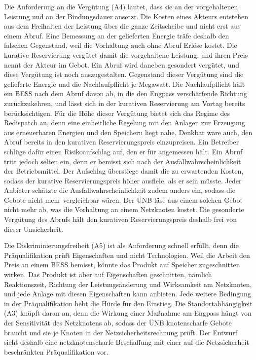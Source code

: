 Die Anforderung an die Vergütung (A4) lautet, dass sie an der vorgehaltenen Leistung und an der Bindungsdauer ansetzt.
Die Kosten eines Akteurs entstehen aus dem Freihalten der Leistung über die ganze Zeitscheibe und nicht erst aus einem Abruf.
Eine Bemessung an der gelieferten Energie träfe deshalb den falschen Gegenstand, weil die Vorhaltung auch ohne Abruf Erlöse kostet.
Die kurative Reservierung vergütet damit die vorgehaltene Leistung, und ihren Preis nennt der Akteur im Gebot.
Ein Abruf wird daneben gesondert vergütet, und diese Vergütung ist noch auszugestalten.
Gegenstand dieser Vergütung sind die gelieferte Energie und die Nachlaufpflicht je Megawatt.
Die Nachlaufpflicht hält ein \ac{BESS} nach dem Abruf davon ab, in die den Engpass verschärfende Richtung zurückzukehren, und lässt sich in der kurativen Reservierung am Vortag bereits berücksichtigen.
Für die Höhe dieser Vergütung bietet sich das Regime des Redispatch an, denn eine einheitliche Regelung mit den Anlagen zur Erzeugung aus erneuerbaren Energien und den Speichern liegt nahe.
Denkbar wäre auch, den Abruf bereits in den kurativen Reservierungspreis einzupreisen.
Ein Betreiber schlüge dafür einen Risikoaufschlag auf, den er für angemessen hält.
Ein Abruf tritt jedoch selten ein, denn er bemisst sich nach der Ausfallwahrscheinlichkeit der Betriebsmittel.
Der Aufschlag überstiege damit die zu erwartenden Kosten, sodass der kurative Reservierungspreis höher ausfiele, als er sein müsste.
Jeder Anbieter schätzte die Ausfallwahrscheinlichkeit zudem anders ein, sodass die Gebote nicht mehr vergleichbar wären.
Der \ac{ÜNB} läse aus einem solchen Gebot nicht mehr ab, was die Vorhaltung an einem Netzknoten kostet.
Die gesonderte Vergütung des Abrufs hält den kurativen Reservierungspreis deshalb frei von dieser Unsicherheit.

Die Diskriminierungsfreiheit (A5) ist als Anforderung schnell erfüllt, denn die Präqualifikation prüft Eigenschaften und nicht Technologien.
Weil die Arbeit den Preis an einem \ac{BESS} bemisst, könnte das Produkt auf Speicher zugeschnitten wirken.
Das Produkt ist aber auf Eigenschaften geschnitten, nämlich Reaktionszeit, Richtung der Leistungsänderung und Wirksamkeit am Netzknoten, und jede Anlage mit diesen Eigenschaften kann anbieten.
Jede weitere Bedingung in der Präqualifikation hebt die Hürde für den Einstieg.
Die Standortabhängigkeit (A3) knüpft daran an, denn die Wirkung einer Maßnahme am Engpass hängt von der Sensitivität des Netzknotens ab, sodass der \ac{ÜNB} knotenscharfe Gebote braucht und sie je Knoten in der Netzsicherheitsrechnung prüft.
Der Entwurf sieht deshalb eine netzknotenscharfe Beschaffung mit einer auf die Netzsicherheit beschränkten Präqualifikation vor.

